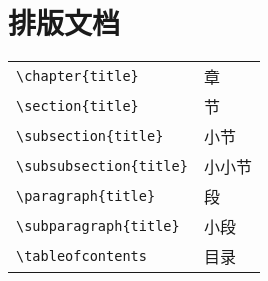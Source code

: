 \newpage
\section{排版文档}

\begin{table}[h!]
	\centering
	\begin{minipage}[t]{0.46\textwidth}
		\centering
		\begin{tabular}{l l}
			\hline
			\verb|\chapter{|{\color{gray}\verb|title|}\verb|}|       & 章 \\
			\verb|\section{|{\color{gray}\verb|title|}\verb|}|       & 节 \\
			\verb|\subsection{|{\color{gray}\verb|title|}\verb|}|    & 小节 \\
			\verb|\subsubsection{|{\color{gray}\verb|title|}\verb|}| & 小小节 \\
			\verb|\paragraph{|{\color{gray}\verb|title|}\verb|}|     & 段 \\
			\verb|\subparagraph{|{\color{gray}\verb|title|}\verb|}|  & 小段 \\
			\verb|\tableofcontents|                                  & 目录 \\
			\hline
		\end{tabular}
	\end{minipage}
	\qquad
	\begin{minipage}[t]{0.46\textwidth}
		\centering
		\begin{tabular}{l l}
			\hline
			\hline
		\end{tabular}
	\end{minipage}
\end{table}

\newpage
\layout


\newpage
